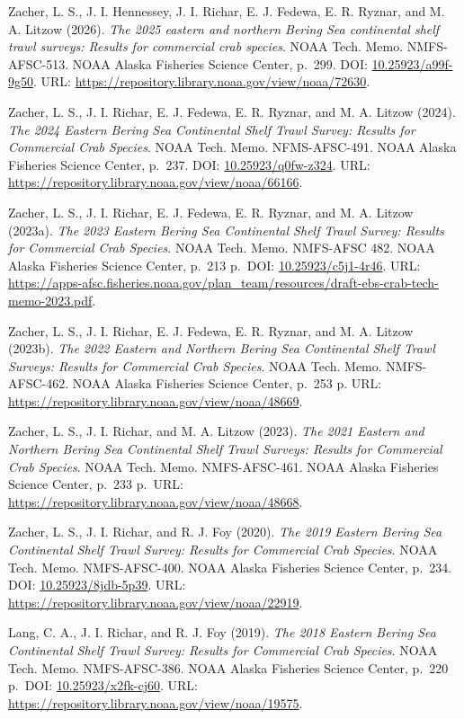 \documentclass[
  letterpaper,
  oneside,
  open=any]{scrbook}
\begin{document}
Zacher, L. S., J. I. Hennessey, J. I. Richar, E. J. Fedewa, E. R.
Ryznar, and M. A. Litzow (2026). \emph{The 2025 eastern and northern
Bering Sea continental shelf trawl surveys: Results for commercial crab
species}. NOAA Tech. Memo. NMFS-AFSC-513. NOAA Alaska Fisheries Science
Center, p.~299. DOI:
\href{https://doi.org/10.25923\%2Fa99f-9g50}{10.25923/a99f-9g50}. URL:
\url{https://repository.library.noaa.gov/view/noaa/72630}.

Zacher, L. S., J. I. Richar, E. J. Fedewa, E. R. Ryznar, and M. A.
Litzow (2024). \emph{The 2024 Eastern Bering Sea Continental Shelf Trawl
Survey: Results for Commercial Crab Species}. NOAA Tech. Memo.
NFMS-AFSC-491. NOAA Alaska Fisheries Science Center, p.~237. DOI:
\href{https://doi.org/10.25923\%2Fq0fw-z324}{10.25923/q0fw-z324}. URL:
\url{https://repository.library.noaa.gov/view/noaa/66166}.

Zacher, L. S., J. I. Richar, E. J. Fedewa, E. R. Ryznar, and M. A.
Litzow (2023a). \emph{The 2023 Eastern Bering Sea Continental Shelf
Trawl Survey: Results for Commercial Crab Species}. NOAA Tech. Memo.
NMFS-AFSC 482. NOAA Alaska Fisheries Science Center, p.~213 p.~DOI:
\href{https://doi.org/10.25923\%2Fc5j1-4r46}{10.25923/c5j1-4r46}. URL:
\url{https://apps-afsc.fisheries.noaa.gov/plan_team/resources/draft-ebs-crab-tech-memo-2023.pdf}.

Zacher, L. S., J. I. Richar, E. J. Fedewa, E. R. Ryznar, and M. A.
Litzow (2023b). \emph{The 2022 Eastern and Northern Bering Sea
Continental Shelf Trawl Surveys: Results for Commercial Crab Species}.
NOAA Tech. Memo. NMFS-AFSC-462. NOAA Alaska Fisheries Science Center,
p.~253 p. URL:
\url{https://repository.library.noaa.gov/view/noaa/48669}.

Zacher, L. S., J. I. Richar, and M. A. Litzow (2023). \emph{The 2021
Eastern and Northern Bering Sea Continental Shelf Trawl Surveys: Results
for Commercial Crab Species}. NOAA Tech. Memo. NMFS-AFSC-461. NOAA
Alaska Fisheries Science Center, p.~233 p.~URL:
\url{https://repository.library.noaa.gov/view/noaa/48668}.

Zacher, L. S., J. I. Richar, and R. J. Foy (2020). \emph{The 2019
Eastern Bering Sea Continental Shelf Trawl Survey: Results for
Commercial Crab Species}. NOAA Tech. Memo. NMFS-AFSC-400. NOAA Alaska
Fisheries Science Center, p.~234. DOI:
\href{https://doi.org/10.25923\%2F8jdb-5p39}{10.25923/8jdb-5p39}. URL:
\url{https://repository.library.noaa.gov/view/noaa/22919}.

Lang, C. A., J. I. Richar, and R. J. Foy (2019). \emph{The 2018 Eastern
Bering Sea Continental Shelf Trawl Survey: Results for Commercial Crab
Species}. NOAA Tech. Memo. NMFS-AFSC-386. NOAA Alaska Fisheries Science
Center, p.~220 p.~DOI:
\href{https://doi.org/10.25923\%2Fx2fk-cj60}{10.25923/x2fk-cj60}. URL:
\url{https://repository.library.noaa.gov/view/noaa/19575}.
\end{document}
